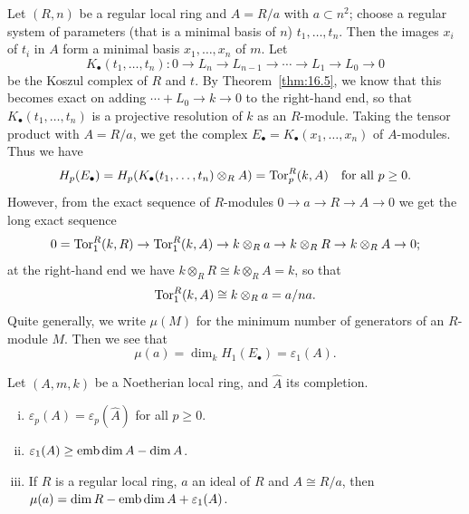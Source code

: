 Let $(R, n)$ be a regular local ring and $A = R/a$ with $a \subset n^2$; choose a
regular system of parameters (that is a minimal basis of $n$) $t_1, \ldots, t_n$.
Then the images $x_i$ of $t_i$ in $A$ form a minimal basis $x_1, \ldots, x_n$ of $m$. Let
\[
  K_\bullet(t_1, \ldots, t_n)\colon 0 \to L_n \to L_{n-1} \to \cdots \to L_1 \to L_0 \to 0
\]
be the Koszul complex of $R$ and $t$. By Theorem~\ref{thm:16.5}, we know that this
becomes exact on adding $\cdots + L_0 \to k \to 0$ to the right-hand end, so that
$K_\bullet(t_1, \ldots, t_n)$ is a projective resolution of $k$ as an $R$-module. Taking the tensor
product with $A = R/a$, we get the complex $E_\bullet = K_\bullet(x_1, \ldots, x_n)$ of $A$-modules.
Thus we have
\[
  H_p(E_\bullet) = H_p(K_\bullet(t_1, \ldots, t_n) \otimes_R A) = \operatorname{Tor}_p^R(k, A) \quad \text{for all } p \ge 0.
\]
However, from the exact sequence of $R$-modules $0 \to a \to R \to A \to 0$ we
get the long exact sequence
\[
  0 = \operatorname{Tor}_1^R(k, R) \to \operatorname{Tor}_1^R(k, A) \to k \otimes_R a \to k \otimes_R R
      \to k \otimes_R A \to 0;
\]
at the right-hand end we have $k \otimes_R R \cong k \otimes_R A = k$, so that
\[
  \operatorname{Tor}_1^R(k, A) \cong k \otimes_R a = a/na.
\]
Quite generally, we write $\mu(M)$ for the minimum number of generators of
an $R$-module $M$. Then we see that
\[
  \mu(a) = \dim_k H_1(E_\bullet) = \varepsilon_1(A).
\]

\begin{theorem}\label{thm:21.1}
Let $(A, m, k)$ be a Noetherian local ring, and $\hat{A}$ its
completion.
\begin{enumerate}[(i)]
  \item $\varepsilon_p(A) = \varepsilon_p(\hat{A})$ for all $p \ge 0$.
  \item $\varepsilon_1(A) \ge \operatorname{emb\,dim} A - \dim A$.
  \item If $R$ is a regular local ring, $a$ an ideal of $R$ and $A \cong R/a$, then
        $\mu(a) = \dim R - \operatorname{emb\,dim} A + \varepsilon_1(A)$.
\end{enumerate}
\end{theorem}

